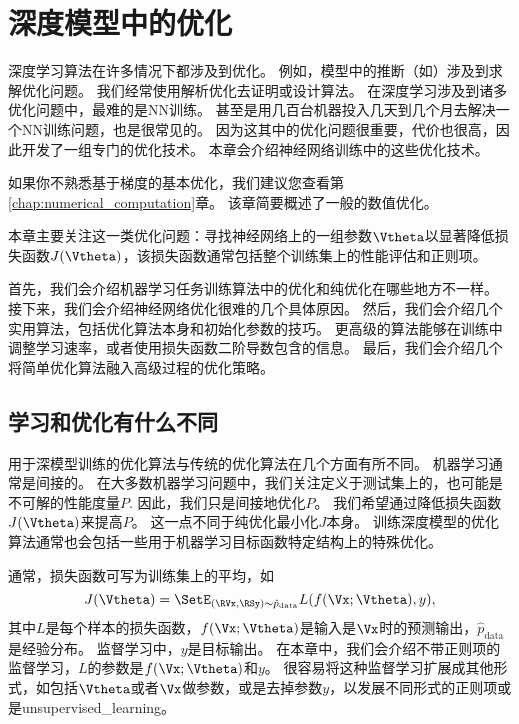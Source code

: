 \chapter{深度模型中的优化}
\label{chap:optimization_for_training_deep_models}
深度学习算法在许多情况下都涉及到优化。
例如，模型中的推断（如）涉及到求解优化问题。
我们经常使用解析优化去证明或设计算法。
在深度学习涉及到诸多优化问题中，最难的是\gls{NN}训练。
甚至是用几百台机器投入几天到几个月去解决一个\gls{NN}训练问题，也是很常见的。
因为这其中的优化问题很重要，代价也很高，因此开发了一组专门的优化技术。
本章会介绍神经网络训练中的这些优化技术。

如果你不熟悉基于梯度的基本优化，我们建议您查看第\ref{chap:numerical_computation}章。
该章简要概述了一般的数值优化。

本章主要关注这一类优化问题：寻找神经网络上的一组参数$\Vtheta$以显著降低损失函数$J(\Vtheta)$，该损失函数通常包括整个训练集上的性能评估和正则项。

首先，我们会介绍机器学习任务训练算法中的优化和纯优化在哪些地方不一样。
接下来，我们会介绍神经网络优化很难的几个具体原因。
然后，我们会介绍几个实用算法，包括优化算法本身和初始化参数的技巧。
更高级的算法能够在训练中调整学习速率，或者使用损失函数二阶导数包含的信息。
最后，我们会介绍几个将简单优化算法融入高级过程的优化策略。


\section{学习和优化有什么不同}
\label{sec:how_learning_differs_from_pure_optimization}
用于深模型训练的优化算法与传统的优化算法在几个方面有所不同。
机器学习通常是间接的。
在大多数机器学习问题中，我们关注定义于测试集上的，也可能是不可解的性能度量$P$.
因此，我们只是间接地优化$P$。
我们希望通过降低损失函数$J(\Vtheta)$来提高$P$。
这一点不同于纯优化最小化$J$本身。
训练深度模型的优化算法通常也会包括一些用于机器学习目标函数特定结构上的特殊优化。

通常，损失函数可写为训练集上的平均，如
\begin{equation}
\label{eq:8.1}
    J(\Vtheta) = \SetE_{(\RVx, \RSy) \sim\hat{p}_\text{data}} L(f(\Vx; \Vtheta), y),
\end{equation}
其中$L$是每个样本的损失函数，$f(\Vx;\Vtheta)$是输入是$\Vx$时的预测输出，$\hat{p}_{\text{data}}$是经验分布。
监督学习中，$y$是目标输出。
在本章中，我们会介绍不带正则项的监督学习，$L$的参数是$f(\Vx;\Vtheta)$和$y$。
很容易将这种监督学习扩展成其他形式，如包括$\Vtheta$或者$\Vx$做参数，或是去掉参数$y$，以发展不同形式的正则项或是\gls{unsupervised_learning}。

